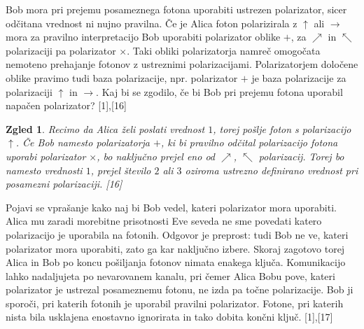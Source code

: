 \documentclass[A4paper, 11pt]{article}
\newtheorem{zgled}{Zgled}
\begin{document}
Bob mora pri prejemu posameznega fotona uporabiti ustrezen polarizator, sicer odčitana vrednost ni nujno pravilna. Če je Alica foton polarizirala z $\uparrow$ ali $\rightarrow$ mora za pravilno interpretacijo Bob uporabiti polarizator oblike $+$, za $\nearrow$ in $\nwarrow$ polarizaciji pa polarizator $\times$. Taki obliki polarizatorja namreč omogočata nemoteno prehajanje fotonov z ustreznimi polarizacijami. Polarizatorjem določene oblike pravimo tudi baza polarizacije, npr. polarizator $+$ je baza polarizacije za polarizaciji $\uparrow$ in $\rightarrow$. Kaj bi se zgodilo, če bi Bob pri prejemu fotona uporabil napačen polarizator? [1],[16]

\begin{zgled}
Recimo da Alica želi poslati vrednost $1$, torej pošlje foton s polarizacijo $\uparrow$. Če Bob namesto polarizatorja $+$, ki bi pravilno odčital polarizacijo fotona uporabi polarizator $\times$, bo naključno prejel eno od $\nearrow$, $\nwarrow$ polarizacij. Torej bo namesto vrednosti $1$, prejel število $2$ ali $3$ oziroma ustrezno definirano vrednost pri posamezni polarizaciji. [16]
\end{zgled}

Pojavi se vprašanje kako naj bi Bob vedel, kateri polarizator mora uporabiti. Alica mu zaradi morebitne prisotnosti Eve seveda ne sme povedati katero polarizacijo je uporabila na fotonih. Odgovor je preprost: tudi Bob ne ve, kateri polarizator mora uporabiti, zato ga kar naključno izbere. Skoraj zagotovo torej Alica in Bob po koncu pošiljanja fotonov nimata enakega ključa. Komunikacijo lahko nadaljujeta po nevarovanem kanalu, pri čemer Alica Bobu pove, kateri polarizator je ustrezal posameznemu fotonu, ne izda pa točne polarizacije. Bob ji sporoči, pri katerih fotonih je uporabil pravilni polarizator. Fotone, pri katerih nista bila usklajena enostavno ignorirata in tako dobita končni ključ. [1],[17] \\
\end{document}

